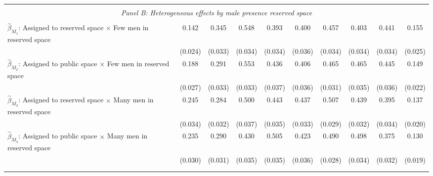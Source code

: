 \begin{tabular}{l*{9}{c}}
\hline \\[-1ex] \multicolumn{10}{c}{\textit{Panel B: Heterogeneous effects by male presence reserved space}} \\\\[-1ex]
$\hat\beta_{M_1}$: Assigned to reserved space $\times$ Few men in reserved space&       0.142\sym{***}&       0.345\sym{***}&       0.548\sym{***}&       0.393\sym{***}&       0.400\sym{***}&       0.457\sym{***}&       0.403\sym{***}&       0.441\sym{***}&       0.155\sym{***}\\
                    &     (0.024)         &     (0.033)         &     (0.034)         &     (0.034)         &     (0.036)         &     (0.034)         &     (0.034)         &     (0.034)         &     (0.025)         \\
[1em]
$\hat\beta_{M_2}$: Assigned to public space $\times$ Few men in reserved space&       0.188\sym{***}&       0.291\sym{***}&       0.553\sym{***}&       0.436\sym{***}&       0.406\sym{***}&       0.465\sym{***}&       0.465\sym{***}&       0.445\sym{***}&       0.149\sym{***}\\
                    &     (0.027)         &     (0.033)         &     (0.033)         &     (0.037)         &     (0.036)         &     (0.031)         &     (0.035)         &     (0.036)         &     (0.022)         \\
[1em]
$\hat\beta_{M_3}$: Assigned to reserved space $\times$ Many men in reserved space&       0.245\sym{***}&       0.284\sym{***}&       0.500\sym{***}&       0.443\sym{***}&       0.437\sym{***}&       0.507\sym{***}&       0.439\sym{***}&       0.395\sym{***}&       0.137\sym{***}\\
                    &     (0.034)         &     (0.032)         &     (0.037)         &     (0.035)         &     (0.033)         &     (0.029)         &     (0.032)         &     (0.034)         &     (0.020)         \\
[1em]
$\hat\beta_{M_4}$: Assigned to public space $\times$ Many men in reserved space&       0.235\sym{***}&       0.290\sym{***}&       0.430\sym{***}&       0.505\sym{***}&       0.423\sym{***}&       0.490\sym{***}&       0.498\sym{***}&       0.375\sym{***}&       0.130\sym{***}\\
                    &     (0.030)         &     (0.031)         &     (0.035)         &     (0.035)         &     (0.036)         &     (0.028)         &     (0.034)         &     (0.032)         &     (0.019)         \\
\\[-1.8ex] \hline \\[-1.8ex]  

\end{tabular}
